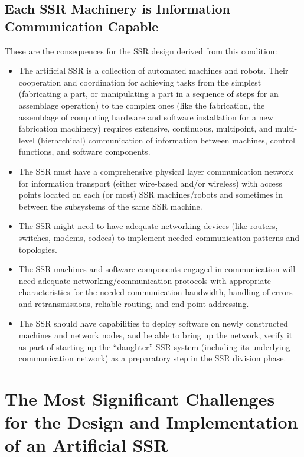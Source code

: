 \subsection[Each SSR Machinery is Information Communication
Capable]{Each SSR Machinery is Information Communication Capable}

These are the consequences for
the SSR design derived from this condition:

\begin{itemize}
\item The artificial SSR is a collection of automated machines and
robots. Their cooperation and coordination for achieving tasks from the
simplest (fabricating a part, or manipulating a part in a sequence of
steps for an assemblage operation) to the complex ones (like the
fabrication, the assemblage of computing hardware and software
installation for a new fabrication machinery) requires extensive,
continuous, multipoint, and multi-level (hierarchical) communication of
information between machines, control functions, and software
components.
\item The SSR must have a comprehensive physical layer communication
network for information transport (either wire-based and/or wireless)
with access points located on each (or most) SSR machines/robots and
sometimes in between the subsystems of the same SSR machine.
\item The SSR might need to have adequate networking devices (like
routers, switches, modems, codecs) to implement needed communication
patterns and topologies.
\item The SSR machines and software components engaged in communication
will need adequate networking/communication protocols with appropriate
characteristics for the needed communication bandwidth, handling of
errors and retransmissions, reliable routing, and end point addressing.
\item The SSR should have capabilities to deploy software on newly
constructed machines and network nodes, and be able to bring up the
network, verify it as part of starting up the “daughter” SSR system
(including its underlying communication network) as a preparatory step
in the SSR division phase.
\end{itemize}

\section[The Most Significant Challenges]{The Most Significant Challenges for the Design and Implementation of an Artificial SSR}

